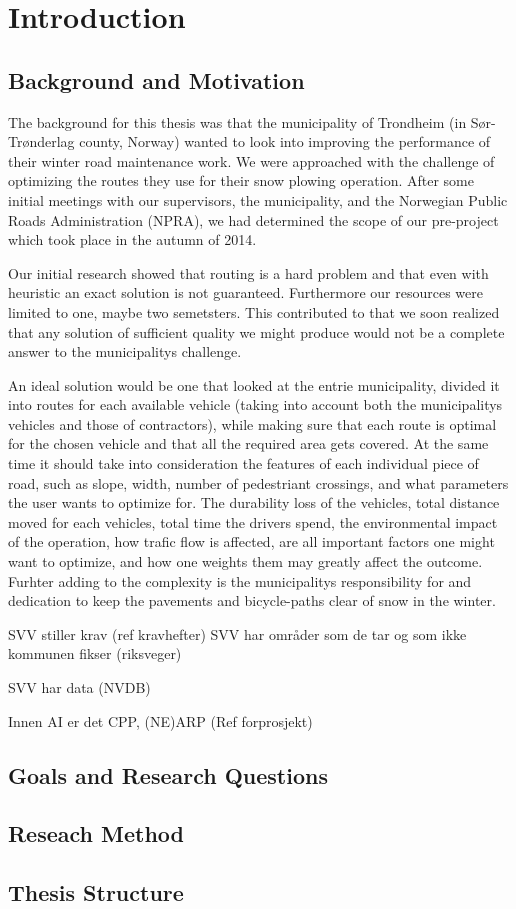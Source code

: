 \chapter{Introduction}

\section{Background and Motivation}

The background for this thesis was that the municipality of Trondheim (in Sør-Trønderlag county, Norway) wanted to look into improving the performance of their winter road maintenance work. We were approached with the challenge of optimizing the routes they use for their snow plowing operation. After some initial meetings with our supervisors, the municipality, and the Norwegian Public Roads Administration (NPRA), we had determined the scope of our pre-project which took place in the autumn of 2014.

Our initial research showed that routing is a hard problem and that even with heuristic an exact solution is not guaranteed. Furthermore our resources were limited to one, maybe two semetsters. This contributed to that we soon realized that any solution of sufficient quality we might produce would not be a complete answer to the municipalitys challenge.

An ideal solution would be one that looked at the entrie municipality, divided it into routes for each available vehicle (taking into account both the municipalitys vehicles and those of contractors), while making sure that each route is optimal for the chosen vehicle and that all the required area gets covered. At the same time it should take into consideration the features of each individual piece of road, such as slope, width, number of pedestriant crossings, and what parameters the user wants to optimize for. The durability loss of the vehicles, total distance moved for each vehicles, total time the drivers spend, the environmental impact of the operation, how trafic flow is affected, are all important factors one might want to optimize, and how one weights them may greatly affect the outcome. Furhter adding to the complexity is the municipalitys responsibility for and dedication to keep the pavements and bicycle-paths clear of snow in the winter.

SVV stiller krav (ref kravhefter)
	SVV har områder som de tar og som ikke kommunen fikser (riksveger)

SVV har data (NVDB)

Innen AI er det CPP, (NE)ARP (Ref forprosjekt)

\section{Goals and Research Questions}

\section{Reseach Method}

\section{Thesis Structure}



\cleardoublepage
